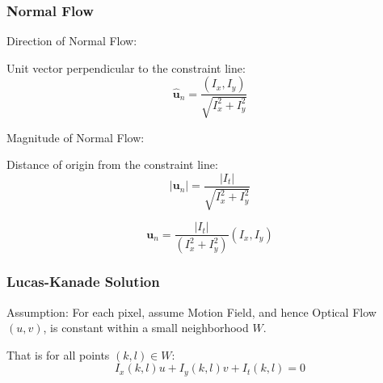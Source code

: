 
\begin{frame}
  \frametitle{Normal Flow}

  Direction of Normal Flow:

  Unit vector perpendicular to the constraint line:
  \[
  \hat{\mathbf{u}}_n = \frac{(I_x, I_y)}{\sqrt{I_x^2 + I_y^2}}
  \]

  Magnitude of Normal Flow:

  Distance of origin from the constraint line:
  \[
  |\mathbf{u}_n| = \frac{|I_t|}{\sqrt{I_x^2 + I_y^2}}
  \]

  \[
  \boxed{\mathbf{u}_n = \frac{|I_t|}{(I_x^2 + I_y^2)} (I_x, I_y)}
  \]


\end{frame}



\begin{frame}
  \frametitle{Lucas-Kanade Solution}

  Assumption: For each pixel, assume Motion Field, and hence Optical Flow $(u,v)$, is constant within a small neighborhood $W$.


  That is for all points $(k,l) \in W$:
  \[
  I_x(k,l)u + I_y(k,l)v + I_t(k,l) = 0
  \]

\end{frame}

